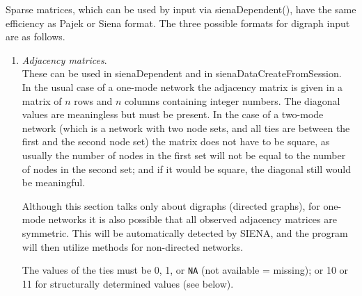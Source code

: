\documentclass[a4paper,fleqn,11pt]{article}
\newcommand{\+}{\, + \,}
\newcommand{\sfn}[1]{\textsf{#1}}
\newcommand{\si}{{\sf SIENA}}
\newcommand{\sn}{{\sf StOCNET}}
\begin{document}
Sparse matrices, which can be used by input via
\sfn{sienaDependent()}, have the same efficiency as Pajek or
Siena format.
The three possible formats for digraph input are as follows.
\begin{enumerate}
\item \emph{Adjacency matrices}.\\
      These can be used in  \sfn{sienaDependent} and in
      \sfn{sienaDataCreateFromSession}.\\
      In the usual case of a one-mode network the adjacency matrix
      is given in a matrix of $n$ rows and $n$ columns
      containing integer numbers.
      The diagonal values are meaningless but must be present.
      In the case of a two-mode network (which is a network with two
      node sets, and all ties are between the first and the second node set)
      the matrix does not have to be
      square, as usually the number of nodes in the first set will not be
      equal to the number of nodes in the second set;
      and if it would be square, the diagonal still would be meaningful.

      Although this section talks only about digraphs (directed graphs),
      for one-mode networks it is
      also possible that all observed adjacency matrices are symmetric.
      This will be automatically detected by \si, and
      the program will then utilize methods for non-directed networks.

      The values of the ties must be 0, 1, or \texttt{NA}
      (not available = missing);
      or 10 or 11 for structurally determined values (see below).


\end{enumerate}
\end{document}
